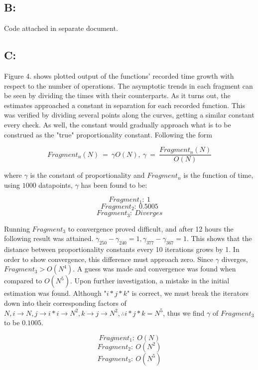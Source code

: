 \documentclass[journal]{IEEEtran}
\begin{document}
\subsection*{B:}

Code attached in separate document.

\subsection*{C:}

Figure 4. shows plotted output of the functions' recorded 
time growth with respect to the number of operations. The asymptotic trends in each fragment 
can be seen by dividing the times with their counterparts. As it turns out, the estimates 
approached a constant in separation for each recorded function. This was verified
by dividing several points along the curves, getting a similar constant every check.
As well, the constant would gradually approach what is to be construed
as the "true" proportionality constant. Following the form 

$$Fragment_n(N)~=~\gamma O(N),~\gamma~=~\frac{Fragment_n(N)}{O(N)}$$ 

where $\gamma$ is the constant of proportionality and $Fragment_n$ is the function of time, 
using $1000$ datapoints, $\gamma$ has been found to be:

$$ Fragment_1:~1 $$
$$ Fragment_2:~0.5005 $$
$$ Fragment_3:~Diverges $$

Running $Fragment_3$ to convergence proved difficult, and after 12 hours the following result was attained.
 $\gamma_{250} - \gamma_{240} = 1, \gamma_{377} - \gamma_{367} = 1$. This shows that the distance between proportionality
 constants every 10 iterations grows by 1. In order to show convergence, this difference must approach zero. Since $\gamma$ 
 diverges, $Fragment_3 > O(N^4)$. A guess was made and convergence was found when compared to $O(N^5)$. Upon further 
 investigation, a mistake in the initial estimation was found. Although "$i*j*k$" is correct, we must break the 
 iterators down into their corresponding factors of $N, i \rightarrow N, j \rightarrow i*i \rightarrow N^2, 
 k \rightarrow j \rightarrow N^2, \therefore i*j*k = N^5$, thus we find $\gamma$ of $Fragment_3$ to be $0.1005$.

$$ Fragment_1:~\boxed{O(N)} $$
$$ Fragment_2:~\boxed{O(N^2)} $$
$$ Fragment_3:~\boxed{O(N^5)} $$
\end{document}
